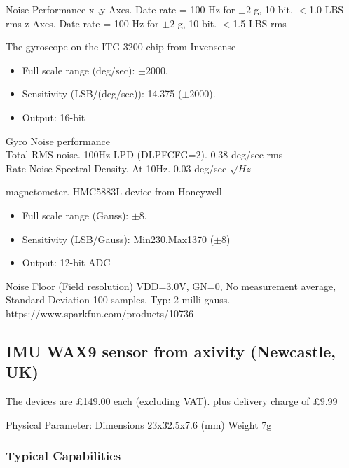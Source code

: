  Noise Performance
 x-,y-Axes. Date rate = 100 Hz for $\pm 2$ g, 10-bit. $<$1.0 LBS rms
 z-Axes.  Date rate = 100 Hz for $\pm 2$ g, 10-bit. $<$1.5 LBS rms


 The gyroscope on the ITG-3200 chip from Invensense
\begin{itemize}
   \item Full scale range (deg/sec):  $\pm$2000.
   \item Sensitivity (LSB/(deg/sec)): 14.375 ($\pm$2000).
   \item Output: 16-bit
 \end{itemize}

 Gyro Noise performance \\
 Total RMS noise. 100Hz LPD (DLPFCFG=2). 0.38 deg/sec-rms\\
 Rate Noise Spectral Density. At 10Hz. 0.03 deg/sec $\sqrt{Hz}$



 magnetometer.  HMC5883L device from Honeywell
\begin{itemize}
   \item Full scale range (Gauss): $\pm$8.
   \item Sensitivity (LSB/Gauss): Min230,Max1370 ($\pm$8)
   \item Output: 12-bit ADC
 \end{itemize}

 Noise Floor (Field resolution) VDD=3.0V, GN=0, No measurement average,
 Standard Deviation 100 samples. Typ: 2 milli-gauss.
 https://www.sparkfun.com/products/10736




 \subsection*{IMU WAX9 sensor from axivity (Newcastle, UK)}

 The devices are £149.00 each (excluding VAT).
 plus delivery charge of £9.99


 Physical Parameter:
 Dimensions 	23x32.5x7.6 (mm)
 Weight 	7g


 \subsubsection*{Typical Capabilities}

